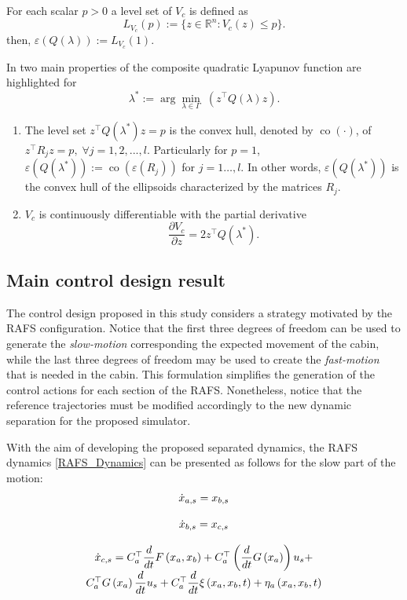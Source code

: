 \documentclass[journal,twocolumn]{IEEEtran}
\newcommand{\co}{\operatorname{co}}
\begin{document}
For each scalar $p>0$ a level set of $V_c$ is defined as
 \begin{equation*}
     L_{V_c}(p):=\lbrace z\in\mathbb{R}^n:V_c(z)\leq p\rbrace.
 \end{equation*}
 then, $\varepsilon(Q(\lambda)):=L_{V_c}(1)$.
 
 In \cite{tingshu} two main properties of the composite quadratic Lyapunov function are highlighted for
 \begin{equation}\label{lam_asterisk}
\lambda^*:=\arg \min_{\lambda\in\Gamma} \; (z^{\top}Q(\lambda)z).
 \end{equation}
 \begin{enumerate}
  \item The level set $z^\top Q(\lambda^*)z=p$ is the convex hull, denoted by $\co(\cdot)$, of $z^{\top}R_jz=p,\; \forall j=1,2,...,l$. Particularly for $p=1$,  $\varepsilon(Q(\lambda^*)) :=\co(\varepsilon(R_j))$ for $j=1\dots,l$. In other words, $\varepsilon(Q(\lambda^*))$ is the convex hull of the ellipsoids characterized by the matrices $R_j$.
  \item $V_c$ is continuously differentiable with the partial derivative
  \begin{equation*}
     \frac{\partial V_c}{\partial z}=2z^{\top}Q(\lambda^*).
 \end{equation*}
 \end{enumerate}

\subsection{Main control design result}

The control design proposed in this study considers a strategy motivated by the RAFS configuration. Notice that the first three degrees of freedom can be used to generate the \textit{slow-motion} corresponding the expected movement of the cabin, while the last three degrees of freedom may be used to create the \textit{fast-motion} that is needed in the cabin. This formulation simplifies the generation of the control actions for each section of the RAFS. Nonetheless, notice that the reference trajectories must be modified accordingly to the new dynamic separation for the proposed simulator. 

With the aim of developing the proposed separated dynamics, the RAFS dynamics \eqref{RAFS_Dynamics} can be presented as follows for the slow part of the motion:
%
\begin{equation}
\begin{array}{c}
\dot{x}_{a,s}=x_{b,s} \\ 
\\
\dot{x}_{b,s}=x_{c,s} \\ 
\\
\dot{x}_{c,s}=C^{\top}_{a} \dfrac{d}{dt} F \left( x_{a},x_{b}\right) + C^{\top}_{a} \left( \dfrac{d}{%
dt}G\left( x_{a}\right) \right) u_{s} + \\
C^{\top}_{a} G\left( x_{a}\right) \dfrac{d}{dt}%
u_{s}+ C^{\top}_{a} \dfrac{d}{dt} \xi \left( x_{a},x_{b},t\right) + \eta_{a}\left( x_{a},x_{b},t\right)
\end{array}%
\label{RAFS_Slow_Dynamics}
\end{equation}
\end{document}

